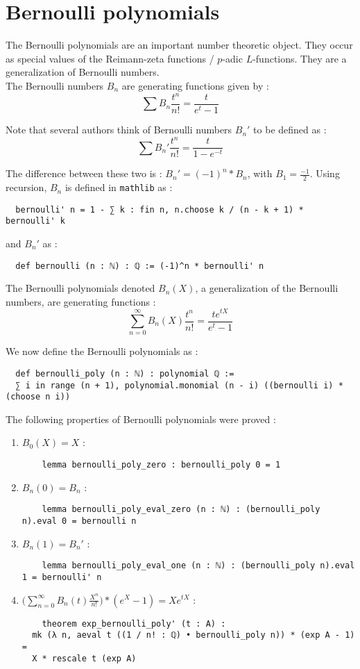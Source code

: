 \documentclass[11pt]{article}
\begin{document}
\section{Bernoulli polynomials}
The Bernoulli polynomials are an important number theoretic object. They occur as special values
of the Reimann-zeta functions / $p$-adic $L$-functions. They are a generalization of
Bernoulli numbers. \\

The Bernoulli numbers $B_n$ are generating functions given by :
$$\sum B_n\frac{t^n}{n!}=\frac{t}{e^{t} - 1}$$

Note that several authors think of Bernoulli numbers $B_n'$ to be defined as :
$$\sum B_n'\frac{t^n}{n!}=\frac{t}{1-e^{-t}}$$

The difference between these two is : $B_n' = (-1)^n * B_n$, with $B_1 = \frac{-1}{2}$.
Using recursion, $B_n$ is defined in \texttt{mathlib} as :
\begin{lstlisting}
  bernoulli' n = 1 - ∑ k : fin n, n.choose k / (n - k + 1) * bernoulli' k
\end{lstlisting}
and $B_n'$ as :
\begin{lstlisting}
  def bernoulli (n : ℕ) : ℚ := (-1)^n * bernoulli' n
\end{lstlisting}

The Bernoulli polynomials denoted $B_n(X)$, a generalization of the Bernoulli numbers,
are generating functions :
$$ \sum_{n = 0}^{\infty} B_n(X) \frac{t^n}{n!} = \frac{t e^{tX}}{e^t - 1} $$

We now define the Bernoulli polynomials as :
\begin{lstlisting}
  def bernoulli_poly (n : ℕ) : polynomial ℚ :=
  ∑ i in range (n + 1), polynomial.monomial (n - i) ((bernoulli i) * (choose n i))
\end{lstlisting}

The following properties of Bernoulli polynomials were proved :
\begin{enumerate}
  \item $ B_0(X) = X $ : \begin{lstlisting}
    lemma bernoulli_poly_zero : bernoulli_poly 0 = 1
  \end{lstlisting}
  \item $ B_n(0) = B_n $ : \begin{lstlisting}
    lemma bernoulli_poly_eval_zero (n : ℕ) : (bernoulli_poly n).eval 0 = bernoulli n
  \end{lstlisting}
  \item $ B_n(1) = B_n' $ : \begin{lstlisting}
    lemma bernoulli_poly_eval_one (n : ℕ) : (bernoulli_poly n).eval 1 = bernoulli' n
  \end{lstlisting}
  \item $ \bigg( \sum_{n = 0}^{\infty} B_n(t) \frac{X^n}{n!} \bigg) * (e^X - 1) = X e^{tX} $ :
  \begin{lstlisting}
    theorem exp_bernoulli_poly' (t : A) :
  mk (λ n, aeval t ((1 / n! : ℚ) • bernoulli_poly n)) * (exp A - 1) =
  X * rescale t (exp A)
  \end{lstlisting}
\end{enumerate}
\end{document}
